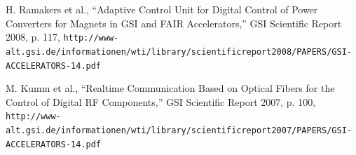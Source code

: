 \documentclass{JAC2003}
\begin{document}
\begin{thebibliography}{9}   %


H. Ramakers  et al., ``Adaptive Control Unit for Digital Control of Power Converters for Magnets in GSI and FAIR Accelerators,'' GSI Scientific Report 2008, p. 117,
\texttt{http://www-alt.gsi.de/informationen/wti/library/scientificreport2008/PAPERS/GSI-ACCELERATORS-14.pdf}

M. Kumm  et al., ``Realtime Communication Based on Optical Fibers for the Control of Digital RF Components,'' GSI Scientific Report 2007, p. 100,
\texttt{http://www-alt.gsi.de/informationen/wti/library/scientificreport2007/PAPERS/GSI-ACCELERATORS-14.pdf}




\end{thebibliography}
\end{document}
